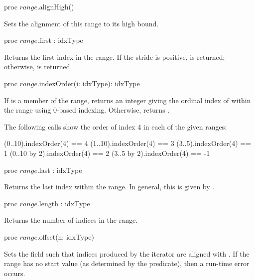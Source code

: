 \begin{protohead}
proc $range$.alignHigh()
\end{protohead}
\begin{protobody}
Sets the alignment of this range to its high bound.
\end{protobody}

\begin{protohead}
proc $range$.first : idxType
\end{protohead}
\begin{protobody}
Returns the first index in the range.  If the stride is positive,
 is returned; otherwise,  is returned.
\end{protobody}

\begin{protohead}
proc $range$.indexOrder(i: idxType): idxType
\end{protohead}
\begin{protobody}
If  is a member of the range, returns an integer giving
the ordinal index of  within the range using 0-based indexing.
Otherwise, returns .
\end{protobody}

\begin{example}
The following calls show the order of index 4 in each of the given
ranges:
\begin{chapel}
(0..10).indexOrder(4) == 4
(1..10).indexOrder(4) == 3
(3..5).indexOrder(4) == 1
(0..10 by 2).indexOrder(4) == 2
(3..5 by 2).indexOrder(4) == -1
\end{chapel}
\end{example}
\begin{protohead}

proc $range$.last : idxType
\end{protohead}
\begin{protobody}
Returns the last index within the range.  In general, this is given
by .
\end{protobody}

\begin{protohead}
proc $range$.length : idxType
\end{protohead}
\begin{protobody}
Returns the number of indices in the range.
\end{protobody}

\label{Range_Offset_Method}
\begin{protohead}
proc $range$.offset(n: idxType)
\end{protohead}
\begin{protobody}
Sets the  field such that indices produced by the iterator are
aligned with .  If the range has no start value (as determined
by the  predicate), then a run-time error occurs.
\end{protobody}

